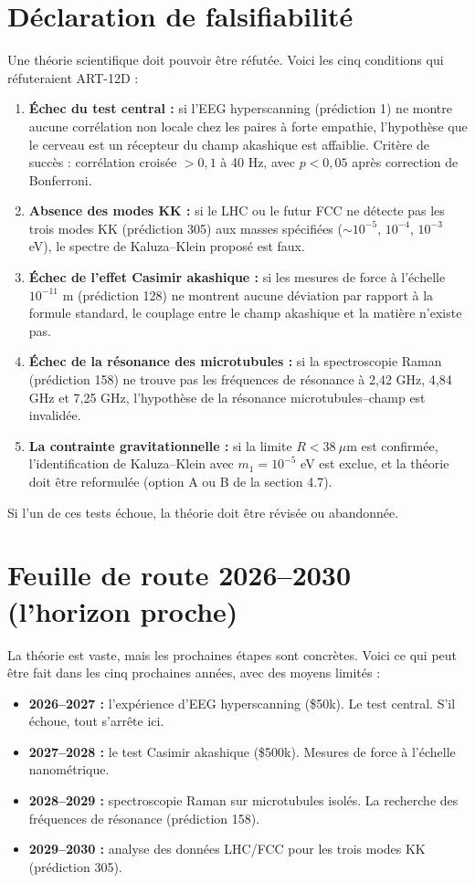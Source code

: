 \documentclass[11pt,a4paper]{article}
\begin{document}
\section{Déclaration de falsifiabilité}
Une théorie scientifique doit pouvoir être réfutée. Voici les cinq conditions qui réfuteraient ART-12D :
\begin{enumerate}
    \item \textbf{Échec du test central :} si l'EEG hyperscanning (prédiction 1) ne montre aucune corrélation non locale chez les paires à forte empathie, l'hypothèse que le cerveau est un récepteur du champ akashique est affaiblie. Critère de succès : corrélation croisée $> 0,1$ à 40 Hz, avec $p < 0,05$ après correction de Bonferroni.
    \item \textbf{Absence des modes KK :} si le LHC ou le futur FCC ne détecte pas les trois modes KK (prédiction 305) aux masses spécifiées ($\sim 10^{-5}$, $10^{-4}$, $10^{-3}$ eV), le spectre de Kaluza--Klein proposé est faux.
    \item \textbf{Échec de l'effet Casimir akashique :} si les mesures de force à l'échelle $10^{-11}$ m (prédiction 128) ne montrent aucune déviation par rapport à la formule standard, le couplage entre le champ akashique et la matière n'existe pas.
    \item \textbf{Échec de la résonance des microtubules :} si la spectroscopie Raman (prédiction 158) ne trouve pas les fréquences de résonance à 2,42 GHz, 4,84 GHz et 7,25 GHz, l'hypothèse de la résonance microtubules--champ est invalidée.
    \item \textbf{La contrainte gravitationnelle :} si la limite $R < 38\ \mu$m est confirmée, l'identification de Kaluza--Klein avec $m_1 = 10^{-5}$ eV est exclue, et la théorie doit être reformulée (option A ou B de la section 4.7).
\end{enumerate}
Si l'un de ces tests échoue, la théorie doit être révisée ou abandonnée.

\section{Feuille de route 2026--2030 (l'horizon proche)}
La théorie est vaste, mais les prochaines étapes sont concrètes. Voici ce qui peut être fait dans les cinq prochaines années, avec des moyens limités :
\begin{itemize}
    \item \textbf{2026--2027 :} l'expérience d'EEG hyperscanning (\$50k). Le test central. S'il échoue, tout s'arrête ici.
    \item \textbf{2027--2028 :} le test Casimir akashique (\$500k). Mesures de force à l'échelle nanométrique.
    \item \textbf{2028--2029 :} spectroscopie Raman sur microtubules isolés. La recherche des fréquences de résonance (prédiction 158).
    \item \textbf{2029--2030 :} analyse des données LHC/FCC pour les trois modes KK (prédiction 305).
\end{itemize}
\end{document}
